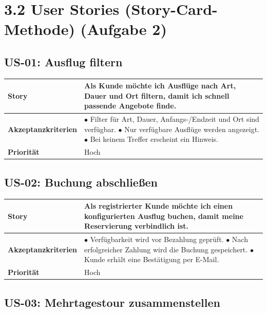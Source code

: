 \documentclass[
	fontsize=12pt,          %
	paper=a4,               %
	numbers=noenddot,       %
	listof=totoc,           %
	listof=entryprefix,     %
	listof=nochaptergap,    %
	bibliography=totoc,     %
	parskip=half,           %
	openany                 %
]{scrbook}
\begin{document}
\section*{3.2 User Stories (Story-Card-Methode) \normalfont\normalsize(Aufgabe 2)}

\subsection*{US-01: Ausflug filtern}

\begin{tabular}{| p{4cm} | p{9.5cm} |}
	\hline
	\textbf{Story} & Als Kunde möchte ich Ausflüge nach Art, Dauer und Ort filtern, damit ich schnell passende Angebote finde. \\ \hline
	\textbf{Akzeptanzkriterien} &
	$\bullet$ Filter für Art, Dauer, Anfangs-/Endzeit und Ort sind verfügbar.\newline
	$\bullet$ Nur verfügbare Ausflüge werden angezeigt.\newline
	$\bullet$ Bei keinem Treffer erscheint ein Hinweis. \\ \hline
	\textbf{Priorität} & Hoch \\ \hline
\end{tabular}


\subsection*{US-02: Buchung abschließen}

\begin{tabular}{| p{4cm} | p{9.5cm} |}
	\hline
	\textbf{Story} & Als registrierter Kunde möchte ich einen konfigurierten Ausflug buchen, damit meine Reservierung verbindlich ist. \\ \hline
	\textbf{Akzeptanzkriterien} &
	$\bullet$ Verfügbarkeit wird vor Bezahlung geprüft.\newline
	$\bullet$ Nach erfolgreicher Zahlung wird die Buchung gespeichert.\newline
	$\bullet$ Kunde erhält eine Bestätigung per E-Mail. \\ \hline
	\textbf{Priorität} & Hoch \\ \hline
\end{tabular}


\subsection*{US-03: Mehrtagestour zusammenstellen}
\end{document}
